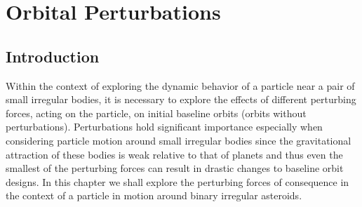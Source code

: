 \chapter{Orbital Perturbations}
\label{perturb}
\graphicspath{{chapter-3/Images/}}
%






\section{Introduction}
Within the context of exploring the dynamic behavior of a particle near a pair of small irregular bodies, it is necessary to explore the effects of different perturbing forces, acting on the particle, on initial baseline orbits (orbits without perturbations). Perturbations hold significant importance especially when considering particle motion around small irregular bodies since the gravitational attraction of these bodies is weak relative to that of planets and thus even the smallest of the perturbing forces can result in drastic changes to baseline orbit designs. In this chapter we shall explore the perturbing forces of consequence in the context of a particle in motion around binary irregular asteroids.

